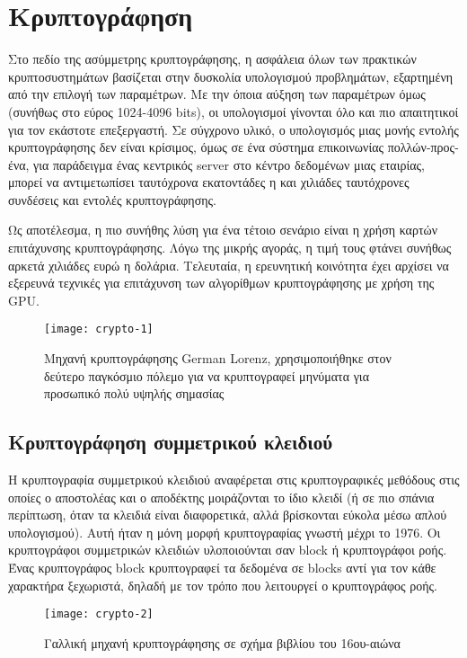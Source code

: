 \section{Κρυπτογράφηση}
Στο πεδίο της ασύμμετρης κρυπτογράφησης, η ασφάλεια όλων των πρακτικών κρυπτοσυστημάτων βασίζεται στην δυσκολία υπολογισμού προβλημάτων, εξαρτημένη από την επιλογή των παραμέτρων. Με την όποια αύξηση των παραμέτρων όμως (συνήθως στο εύρος 1024-4096 bits), οι υπολογισμοί γίνονται όλο και πιο απαιτητικοί για τον εκάστοτε επεξεργαστή. Σε σύγχρονο υλικό, ο υπολογισμός μιας μονής εντολής κρυπτογράφησης δεν είναι κρίσιμος, όμως σε ένα σύστημα επικοινωνίας πολλών-προς-ένα, για παράδειγμα ένας κεντρικός server στο κέντρο δεδομένων μιας εταιρίας, μπορεί να αντιμετωπίσει ταυτόχρονα εκατοντάδες η και χιλιάδες ταυτόχρονες συνδέσεις και εντολές κρυπτογράφησης.

Ως αποτέλεσμα, η πιο συνήθης λύση για ένα τέτοιο σενάριο είναι η χρήση καρτών επιτάχυνσης κρυπτογράφησης. Λόγω της μικρής αγοράς, η τιμή τους φτάνει συνήθως αρκετά χιλιάδες ευρώ η δολάρια.
Τελευταία, η ερευνητική κοινότητα έχει αρχίσει να εξερευνά τεχνικές για επιτάχυνση των αλγορίθμων κρυπτογράφησης με χρήση της GPU. \cite{cryptography-1}

\begin{figure}[h]
\centering
\texttt{[image: crypto-1]}
\caption{Μηχανή κρυπτογράφησης German Lorenz, χρησιμοποιήθηκε στον δεύτερο παγκόσμιο πόλεμο για να κρυπτογραφεί μηνύματα για προσωπικό πολύ υψηλής σημασίας}
\end{figure}

\subsection{Κρυπτογράφηση συμμετρικού κλειδιού}
Η κρυπτογραφία συμμετρικού κλειδιού αναφέρεται στις κρυπτογραφικές μεθόδους στις οποίες ο αποστολέας και ο αποδέκτης μοιράζονται το ίδιο κλειδί (ή σε πιο σπάνια περίπτωση, όταν τα κλειδιά είναι διαφορετικά, αλλά βρίσκονται εύκολα μέσω απλού υπολογισμού). Αυτή ήταν η μόνη μορφή κρυπτογραφίας γνωστή μέχρι το 1976.
Οι κρυπτογράφοι συμμετρικών κλειδιών υλοποιούνται σαν block ή κρυπτογράφοι ροής. Ένας κρυπτογράφος block κρυπτογραφεί τα δεδομένα σε blocks αντί για τον κάθε χαρακτήρα ξεχωριστά, δηλαδή με τον τρόπο που λειτουργεί ο κρυπτογράφος ροής.\cite{cryptography-2}


\begin{figure}[h]
\centering
\texttt{[image: crypto-2]}
\caption{Γαλλική μηχανή κρυπτογράφησης σε σχήμα βιβλίου του 16ου-αιώνα}
\end{figure}

